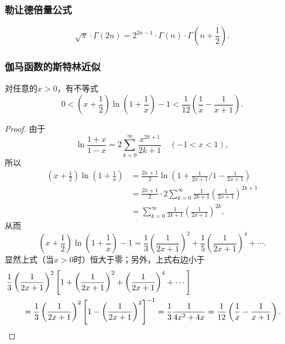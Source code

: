 \subsubsection{勒让德倍量公式}
\begin{theorem}[勒让德倍量公式]
\begin{equation}\label{equation:定积分.勒让德倍量公式}
\sqrt{\pi} \cdot \Gamma(2n)
= 2^{2n-1} \cdot \Gamma(n) \cdot \Gamma\left(n+\frac{1}{2}\right).
\end{equation}
\end{theorem}

\subsubsection{伽马函数的斯特林近似}
\begin{lemma}\label{theorem:定积分.伽马函数的斯特灵近似.引理1}
对任意的\(x>0\)，有不等式\begin{equation}\label{equation:定积分.伽马函数的斯特灵近似.引理1}
0 < \left(x+\frac{1}{2}\right) \ln(1+\frac{1}{x}) - 1 < \frac{1}{12}\left(\frac{1}{x}-\frac{1}{x+1}\right).
\end{equation}
\begin{proof}
由于\[
\ln\frac{1+x}{1-x}
= 2 \sum\limits_{k=0}^\infty \frac{x^{2k+1}}{2k+1}
\quad(-1<x<1),
\]所以\begin{align*}
\left(x+\frac{1}{2}\right) \ln(1+\frac{1}{x})
&= \frac{2x+1}{2} \ln({1+\frac{1}{2x+1}}\Bigg/{1-\frac{1}{2x+1}}) \\
&= \frac{2x+1}{2} \cdot
2 \sum\limits_{k=0}^\infty \frac{1}{2k+1} \left(\frac{1}{2x+1}\right)^{2k+1} \\
&= \sum\limits_{k=0}^\infty \frac{1}{2k+1} \left(\frac{1}{2x+1}\right)^{2k},
\end{align*}从而\[
\left(x+\frac{1}{2}\right) \ln(1+\frac{1}{x}) - 1
= \frac{1}{3} \left(\frac{1}{2x+1}\right)^2
+ \frac{1}{5} \left(\frac{1}{2x+1}\right)^4
+ \dotsb.
\]显然上式（当\(x>0\)时）恒大于零；另外，上式右边小于\begin{align*}
&\hspace{-20pt}
\frac{1}{3} \left(\frac{1}{2x+1}\right)^2 \left[
1 + \left(\frac{1}{2x+1}\right)^2 + \left(\frac{1}{2x+1}\right)^4 + \dotsb
\right] \\
&= \frac{1}{3} \left(\frac{1}{2x+1}\right)^2 \left[
1 - \left(\frac{1}{2x+1}\right)^2
\right]^{-1}
= \frac{1}{3} \frac{1}{4x^2 + 4x}
= \frac{1}{12} \left(\frac{1}{x} - \frac{1}{x+1}\right).
\qedhere
\end{align*}
\end{proof}
\end{lemma}

